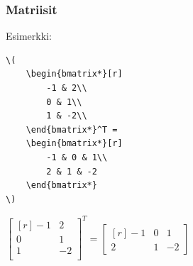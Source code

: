 \documentclass[handout,hyperref={colorlinks=true}]{beamer}
\theoremstyle{remark}
\newcommand{\vaihto}{\\ \vspace{10pt}}
\begin{document}
\begin{frame}[fragile]
    \frametitle{Matriisit}

    Esimerkki:\vaihto
    \begin{minipage}{5cm}
        \begin{scriptsize}
            \begin{Verbatim}[frame=single]
\(
    \begin{bmatrix*}[r]
        -1 & 2\\
        0 & 1\\
        1 & -2\\
    \end{bmatrix*}^T = 
    \begin{bmatrix*}[r]
        -1 & 0 & 1\\
        2 & 1 & -2
    \end{bmatrix*}
\)
            \end{Verbatim}
        \end{scriptsize}
    \end{minipage}
    \begin{minipage}{5cm}
        \(
        \begin{bmatrix*}[r]
            -1 & 2\\
            0 & 1\\
            1 & -2\\
        \end{bmatrix*}^T = 
        \begin{bmatrix*}[r]
            -1 & 0 & 1\\
            2 & 1 & -2
        \end{bmatrix*}
        \)
    \end{minipage}
\end{frame}
\end{document}
